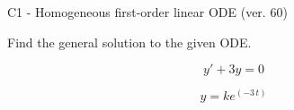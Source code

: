 \begin{exercise}
  \begin{exerciseTitle}C1 - Homogeneous first-order linear ODE (ver. 60)\end{exerciseTitle}
  \begin{exerciseStatement}
    
Find the general solution to the given ODE.

    
\[y'+3y=0\]

  \end{exerciseStatement}
  \begin{exerciseAnswer}
    
\[y= k e^{\left(-3 \, t\right)}\]

  \end{exerciseAnswer}
\end{exercise}